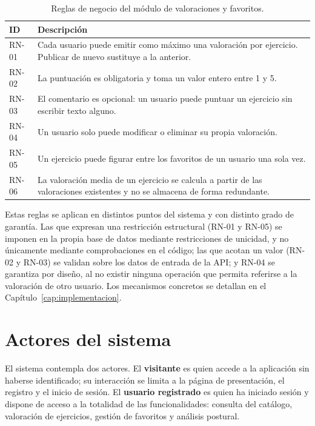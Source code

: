 \documentclass[12pt,a4paper,twoside,openright]{book}
\begin{document}
    \begin{table}[htbp]
        \centering
        \begin{tabular}{l p{10cm}}
            \toprule
            \textbf{ID} & \textbf{Descripción} \\
            \midrule
            RN-01 & Cada usuario puede emitir como máximo una valoración por ejercicio. Publicar de nuevo sustituye a la anterior. \\
            RN-02 & La puntuación es obligatoria y toma un valor entero entre 1 y 5. \\
            RN-03 & El comentario es opcional: un usuario puede puntuar un ejercicio sin escribir texto alguno. \\
            RN-04 & Un usuario solo puede modificar o eliminar su propia valoración. \\
            RN-05 & Un ejercicio puede figurar entre los favoritos de un usuario una sola vez. \\
            RN-06 & La valoración media de un ejercicio se calcula a partir de las valoraciones existentes y no se almacena de forma redundante. \\
            \bottomrule
        \end{tabular}
        \caption{Reglas de negocio del módulo de valoraciones y favoritos.}
        \label{tab:reglas-negocio}
    \end{table}

    Estas reglas se aplican en distintos puntos del sistema y con distinto
    grado de garantía. Las que expresan una restricción estructural (RN-01 y
    RN-05) se imponen en la propia base de datos mediante restricciones de
    unicidad, y no únicamente mediante comprobaciones en el código; las que
    acotan un valor (RN-02 y RN-03) se validan sobre los datos de entrada de la
    API; y RN-04 se garantiza por diseño, al no existir ninguna operación que
    permita referirse a la valoración de otro usuario. Los mecanismos concretos
    se detallan en el Capítulo~\ref{cap:implementacion}.
    
    \section{Actores del sistema}

    El sistema contempla dos actores. El \textbf{visitante} es quien accede a
    la aplicación sin haberse identificado; su interacción se limita a la
    página de presentación, el registro y el inicio de sesión. El
    \textbf{usuario registrado} es quien ha iniciado sesión y dispone de acceso
    a la totalidad de las funcionalidades: consulta del catálogo, valoración de
    ejercicios, gestión de favoritos y análisis postural.
\end{document}
